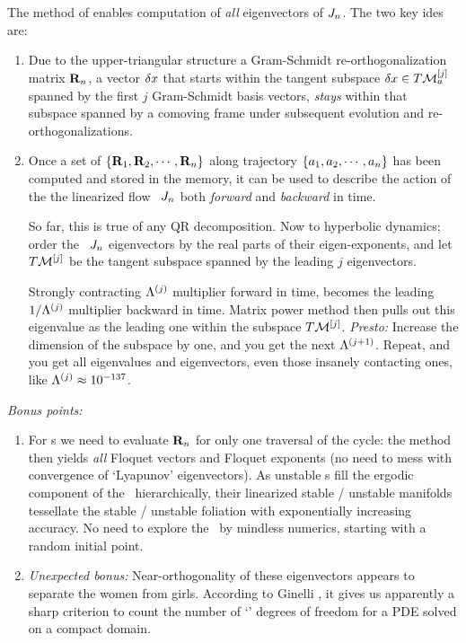 The method of  enables computation of
{\em all} eigenvectors of $J_n$. The two key ides are:
\begin{enumerate}
  \item
Due to the upper-triangular structure a Gram-Schmidt
re-orthogonalization matrix ${\bf R}_n$, a vector ${\delta x}$
that starts within the tangent subspace ${\delta x} \in
T\mathcal{M}_{a}^{[j]}$ spanned by the first $j$ Gram-Schmidt basis
vectors, {\em stays} within that subspace spanned by a comoving
frame under subsequent evolution and re-orthogonalizations.
\item Once a set of $\{{\bf R}_1,{\bf R}_2,\cdots,{\bf R}_n\}$
along trajectory $\{a_1,a_2,\cdots,a_n\}$ has been
computed and stored in the memory, it can be used to describe
the action of the the linearized flow \jacobianM\ $J_n$
both \emph{forward} and \emph{backward} in time.

So far, this is true of any QR decomposition. Now to
hyperbolic dynamics; order the \jacobianM\ $J_n$
eigenvectors \jEigvec[\ell] by the real parts of their
eigen-exponents, and let $T\mathcal{M}^{[j]}$ be the tangent
subspace spanned by the leading $j$ eigenvectors.

Strongly contracting $\Lambda^{(j)}$ multiplier forward in
time, becomes the leading $1/\Lambda^{(j)}$ multiplier
backward in time. Matrix power method then pulls out this
eigenvalue as the leading one within the subspace
$T\mathcal{M}^{[j]}$. \emph{Presto:} Increase the dimension of the
subspace by one, and you get the next $\Lambda^{(j+1)}$.
Repeat, and you get all eigenvalues and eigenvectors, even
those insanely contacting ones, like $\Lambda^{(j)}
\approx 10^{-137}$.

\end{enumerate}
\emph{Bonus points:}
\begin{enumerate}
  \item For {\po s} we need to evaluate ${\bf R}_n$ for
  only one traversal of the cycle: the method then yields {\em
  all} Floquet vectors and Floquet exponents (no need to mess
  with convergence of `Lyapunov' eigenvectors). As unstable \po
  s fill the ergodic component of the \statesp\ hierarchically,
  their linearized stable / unstable manifolds tessellate the
  stable / unstable foliation with exponentially increasing
  accuracy. No need to explore the \statesp\ by mindless
  numerics, starting with a random initial point.

  \item \emph{Unexpected bonus:} Near-orthogonality of
      these eigenvectors appears to separate the women from
      girls. According to Ginelli
      \etal{}, it gives us apparently a
      sharp criterion to count the number of `{\entangled}'
      degrees of freedom for a PDE solved on a compact
      domain.
\end{enumerate}

